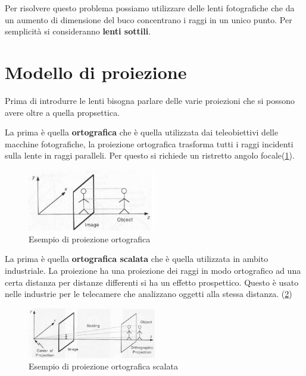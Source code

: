 Per risolvere questo problema possiamo utilizzare delle lenti fotografiche che 
da un aumento di dimensione del buco concentrano i raggi in un unico punto. Per 
semplicità si consideranno \textbf{lenti sottili}.

\section{Modello di proiezione}
Prima di introdurre le lenti bisogna parlare delle varie proiezioni che si possono 
avere oltre a quella propsettica.

La prima è quella \textbf{ortografica} che è quella utilizzata dai teleobiettivi
delle macchine fotografiche, la proiezione ortografica trasforma tutti i raggi incidenti
sulla lente in raggi paralleli. Per questo si richiede un ristretto angolo focale(\ref{fig:ortography}).

\begin{figure}
    \centering
    \includegraphics[width=0.5\textwidth]{figure/proiezione_ortografica.png}
    \caption{Esempio di proiezione ortografica}
    \label{fig:ortography}
\end{figure}

La prima è quella \textbf{ortografica scalata} che è quella utilizzata in ambito 
industriale. La proiezione ha una proiezione dei raggi in modo ortografico 
ad una certa distanza per distanze differenti si ha un effetto prospettico. Questo 
è usato nelle industrie per le telecamere che analizzano oggetti alla stessa distanza.
(\ref{fig:scalata_ortography})

\begin{figure}
    \centering
    \includegraphics[width=0.5\textwidth]{figure/proiezione_ortografica_scalata.png}
    \caption{Esempio di proiezione ortografica scalata}
    \label{fig:scalata_ortography}
\end{figure}

